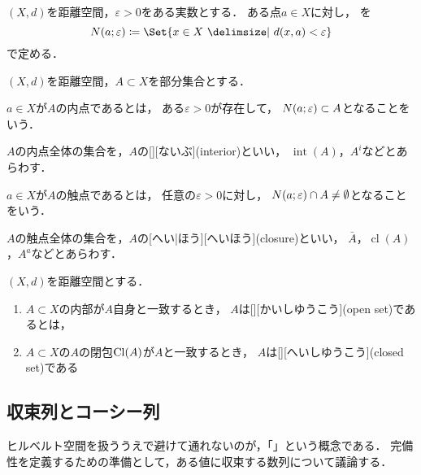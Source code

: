 \documentclass[../sotsu.tex]{subfiles}
\begin{document}
\begin{definition}
    $(X, d)$を距離空間，$\varepsilon > 0$をある実数とする．
    ある点$a \in X$に対し，%
    を
    \begin{equation}
        \neigh(a; \varepsilon) \coloneq \Set{  x \in X  \given  d(x, a) < \varepsilon  }
    \end{equation}
    で定める．
\end{definition}

$(X, d)$を距離空間，$A \subset X$を部分集合とする．

\begin{definition}
    $a \in X$が$A$の内点であるとは，
    ある$\varepsilon > 0$が存在して，
    $N(a; \varepsilon) \subset A$となることをいう．

    $A$の内点全体の集合を，$A$の[][ないぶ](interior)といい，
    $\operatorname{int}(A)$，$A^i$などとあらわす．
\end{definition}

\begin{definition}
    $a \in X$が$A$の触点であるとは，
    任意の$\varepsilon > 0$に対し，
    $N(a; \varepsilon) \cap A \neq \emptyset$となることをいう．

    $A$の触点全体の集合を，$A$の[へい|ほう][へいほう](closure)といい，
    $\bar{A}$，$\operatorname{cl}(A)$，$A^a$などとあらわす．
\end{definition}


\begin{definition}[開集合と閉集合]
    \label{dfn:open-set-and-closed-set}
    $(X, d)$を距離空間とする．
    \begin{enumerate}
        \item $A \subset X$の内部が$A$自身と一致するとき，
            $A$は[][かいしゆうこう](open set)であるとは，
        \item $A \subset X$の$A$の閉包$\mathrm{Cl}(A)$が$A$と一致するとき，
            $A$は[][へいしゆうこう](closed set)である
    \end{enumerate}
\end{definition}



\subsection{収束列とコーシー列}

ヒルベルト空間を扱ううえで避けて通れないのが，「」という概念である．
完備性を定義するための準備として，ある値に収束する数列について議論する．
\end{document}
